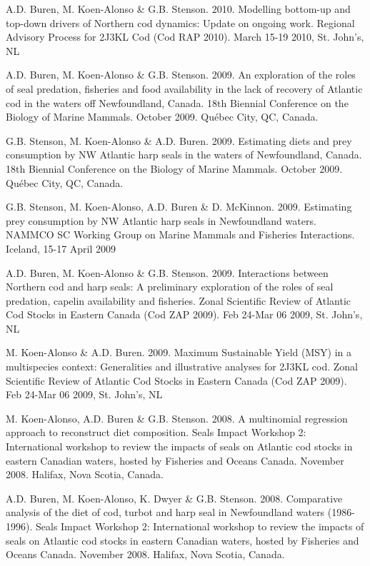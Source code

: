 \documentclass{res}
\begin{document}
\begin{resume}
\begin{hangparas}{.4in}{1}
A.D. Buren, M. Koen-Alonso \& G.B. Stenson. 2010. Modelling bottom-up and top-down drivers of Northern cod dynamics: Update on ongoing work. Regional Advisory Process for 2J3KL Cod (Cod RAP 2010). March 15-19 2010, St. John’s, NL

A.D. Buren, M. Koen-Alonso \& G.B. Stenson. 2009. An exploration of the roles of seal predation, fisheries and food availability in the lack of recovery of Atlantic cod in the waters off Newfoundland, Canada. 18th Biennial Conference on the Biology of Marine Mammals. October 2009. Qu\'{e}bec City, QC, Canada.

G.B. Stenson, M. Koen-Alonso \& A.D. Buren. 2009. Estimating diets and prey consumption by NW Atlantic harp seals in the waters of Newfoundland, Canada. 18th Biennial Conference on the Biology of Marine Mammals. October 2009. Qu\'{e}bec City, QC, Canada.

G.B. Stenson, M. Koen-Alonso, A.D. Buren \& D. McKinnon. 2009. Estimating prey consumption by NW Atlantic harp seals in Newfoundland waters. NAMMCO SC Working Group on Marine Mammals and Fisheries Interactions. Iceland, 15-17 April 2009

A.D. Buren, M. Koen-Alonso \& G.B. Stenson. 2009. Interactions between Northern cod and harp seals: A preliminary exploration of the roles of seal predation, capelin availability and fisheries. Zonal Scientific Review of Atlantic Cod Stocks in Eastern Canada (Cod ZAP 2009). Feb 24-Mar 06 2009, St. John’s, NL

M. Koen-Alonso \& A.D. Buren. 2009. Maximum Sustainable Yield (MSY) in a multispecies context: Generalities and illustrative analyses for 2J3KL cod. Zonal Scientific Review of Atlantic Cod Stocks in Eastern Canada (Cod ZAP 2009). Feb 24-Mar 06 2009, St. John’s, NL

M. Koen-Alonso, A.D. Buren \& G.B. Stenson. 2008. A multinomial regression approach to reconstruct diet composition. Seals Impact Workshop 2: International workshop to review the impacts of seals on Atlantic cod stocks in eastern Canadian waters, hosted by Fisheries and Oceans Canada. November 2008. Halifax, Nova Scotia, Canada.

A.D. Buren, M. Koen-Alonso, K. Dwyer \& G.B. Stenson. 2008. Comparative analysis of the diet of cod, turbot and harp seal in Newfoundland waters (1986-1996). Seals Impact Workshop 2: International workshop to review the impacts of seals on Atlantic cod stocks in eastern Canadian waters, hosted by Fisheries and Oceans Canada. November 2008. Halifax, Nova Scotia, Canada.


\end{hangparas}
\end{resume}
\end{document}
